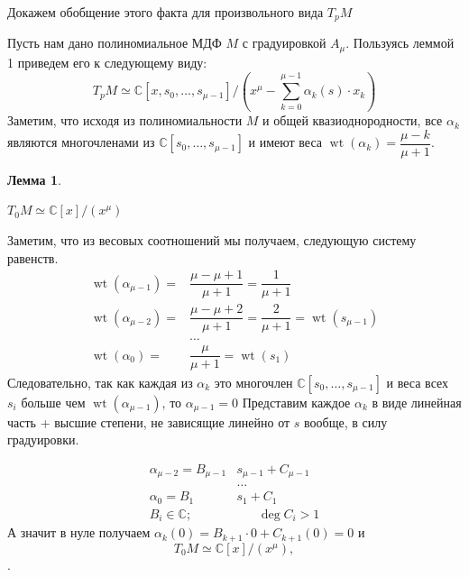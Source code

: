 \documentclass[a4paper, 10pt]{article}
\theoremstyle{plain}
\newtheorem{lem}{Лемма}
\begin{document}
Докажем обобщение этого факта для произвольного вида \(T_pM\)
\par
Пусть нам дано полиномиальное МДФ \(M\) с градуировкой \(A_\mu\). Пользуясь леммой 1 приведем его к следующему виду:
\[
T_pM \simeq \mathbb{C}\left[x, s_0, \dots, s_{\mu - 1}\right]/\left(x^{\mu} - \sum_{k = 0}^{\mu - 1}\alpha_k (s)\cdot x_k\right)
\]
Заметим, что исходя из полиномиальности \(M\) и общей квазиоднородности, все \(\alpha_k\) являются многочленами из \(\mathbb{C}[s_0, \dots, s_{\mu-1}]\) и имеют веса \(\operatorname{wt}(\alpha_k) = \dfrac{\mu - k}{\mu + 1}\).\par 
\begin{lem}\label{lem2}

    \(T_0M \simeq \mathbb C[x]/(x^\mu)\)
\end{lem}
Заметим, что из весовых соотношений мы получаем, следующую систему равенств.
\begin{align*}
    \operatorname{wt}(\alpha_{\mu - 1}) = & \dfrac{\mu - \mu + 1}{\mu + 1} = \dfrac{1}{\mu + 1}\\
    \operatorname{wt}(\alpha_{\mu - 2}) = & \dfrac{\mu - \mu + 2}{\mu + 1} = \dfrac{2}{\mu + 1} = \operatorname{wt}(s_{\mu - 1})\\
    &\dots\\
    \operatorname{wt}(\alpha_{0}) = & \dfrac{\mu}{\mu + 1} = \operatorname{wt}(s_{1})
\end{align*}
Следовательно, так как каждая из \(\alpha_k\) это многочлен \(\mathbb{C}[s_0, \dots, s_{\mu-1}]\) и веса всех \(s_i\) больше чем \(\operatorname{wt}(\alpha_{\mu - 1})\), то \(\alpha_{\mu - 1} = 0\) Представим каждое \(\alpha_k\) в виде линейная часть + высшие степени, не зависящие линейно от \(s\) вообще, в силу градуировки.

\begin{align*}
    \alpha_{\mu - 2} = B_{\mu - 1}&s_{\mu - 1} + C_{\mu -1}\\
    &\dots\\
    \alpha_{0} = B_{1}&s_{1} + C_{1}\\
    B_i \in \mathbb{C};\hspace{20pt}& \hspace{20pt}\operatorname{deg}C_i > 1
\end{align*}
А значит в нуле получаем \(\alpha_k(0) = B_{k+1} \cdot 0 + C_{k+1}(0) = 0\) и
\[
T_0M \simeq \mathbb C[x]/(x^\mu),
\].
\end{document}
